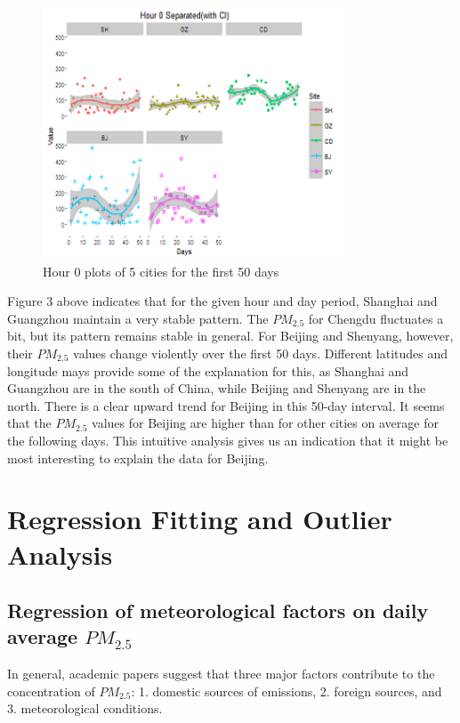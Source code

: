 \documentclass[11pt]{article} %
\begin{document}
\begin{figure}[!bt]
  \centering
    \includegraphics[width=0.8\textwidth]{Figure1-3}
      \caption{Hour 0 plots of 5 cities for the first 50 days}
\end{figure}

Figure 3 above indicates that for the given hour and day period, Shanghai and Guangzhou maintain a very stable pattern. The \(PM_{2.5}\) for Chengdu fluctuates a bit, but its pattern remains stable in general. For Beijing and Shenyang, however, their  \(PM_{2.5}\) values change violently over the first 50 days. Different latitudes and longitude mays provide some of the explanation for this, as Shanghai and Guangzhou are in the south of China, while Beijing and Shenyang are in the north. 
	There is a clear upward trend for Beijing in this 50-day interval. It seems that the \(PM_{2.5}\) values for Beijing are higher than for other cities on average for the following days. This intuitive analysis gives us an indication that it might be most interesting to explain the data for Beijing.

\newpage

\section{Regression Fitting and Outlier Analysis}
\subsection{Regression of meteorological factors on daily average \(PM_{2.5}\)}

In general, academic papers\cite{Chatani11, Tai10, Pohjola02} suggest that three major factors contribute to the concentration of \(PM_{2.5}\): 1. domestic sources of emissions, 2. foreign sources, and 3. meteorological conditions.
\end{document}
